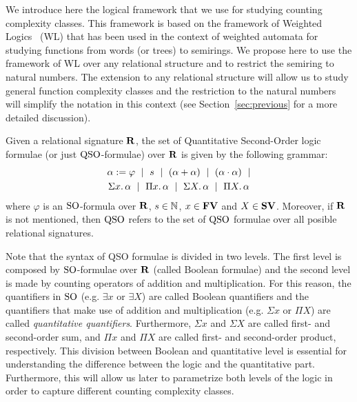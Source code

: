 
We introduce here the logical framework that we use for studying counting complexity classes. 
This framework is based on the framework of Weighted Logics~\cite{DrosteG07} (WL) that has been used in the context of weighted automata for studying functions from words (or trees) to semirings. 
We propose here to use the framework of WL over any relational structure and to restrict the semiring to natural numbers. 
The extension to any relational structure will allow us to study general function complexity classes and the restriction to the natural numbers will simplify the notation in this context (see Section~\ref{sec:previous} for a more detailed discussion).

Given a relational signature $\mathbf{R}$, the set of Quantitative Second-Order logic formulae (or just ${\rm QSO}$-formulae) over $\mathbf{R}$ is given by the following grammar:
\begin{multline}
\alpha := \varphi \ \mid \ s \ \mid \ (\alpha \add \alpha) \ \mid\ (\alpha \mult \alpha) \ \mid \\ \sa{x} \alpha \ \mid \ \pa{x} \alpha \ \mid \ \sa{X} \alpha \ \mid \ \pa{X} \alpha \label{syntax} 
\end{multline}
where $\varphi$ is an ${\rm SO}$-formula over $\mathbf{R}$, $s \in \mathbb{N}$, $x \in \mathbf{FV}$ and $X \in \mathbf{SV}$. Moreover, if $\mathbf{R}$ is not mentioned, then ${\rm QSO}$ refers to the set of ${\rm QSO}$ formulae over all posible relational signatures.
 
Note that the syntax of QSO formulae is divided in two levels. 
The first level is composed by ${\rm SO}$-formulae over $\mathbf{R}$ (called Boolean formulae) and the second level is made by counting operators of addition and multiplication. 
For this reason, the quantifiers in ${\rm SO}$ (e.g. $\exists x$ or $\exists X$) are called Boolean quantifiers and the quantifiers that make use of addition and multiplication (e.g. $\Sigma x$ or $\Pi X$) are called {\em quantitative quantifiers}.
Furthermore, $\Sigma x$ and $\Sigma X$ are called first- and second-order sum, and $\Pi x$ and $\Pi X$ are called first- and second-order product, respectively.
This division between Boolean and quantitative level is essential for understanding the difference between the logic and the quantitative part. 
Furthermore, this will allow us later to parametrize both levels of the logic in order to capture different counting complexity classes.

